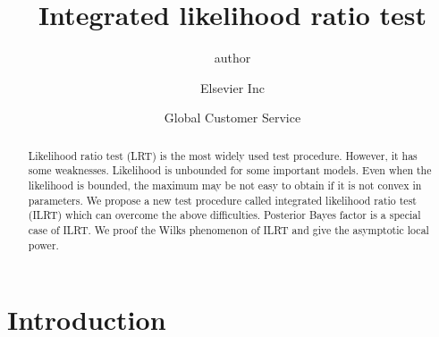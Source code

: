 \documentclass[3p]{elsarticle}
\begin{document}
\begin{frontmatter}

\title{Integrated likelihood ratio test}

\author{author }
\address{Radarweg 29, Amsterdam}

\author[mymainaddress,mysecondaryaddress]{Elsevier Inc}

\author[mysecondaryaddress]{Global Customer Service}

\address[mymainaddress]{1600 John F Kennedy Boulevard, Philadelphia}
\address[mysecondaryaddress]{360 Park Avenue South, New York}

\begin{abstract}

    Likelihood ratio test (LRT) is the most widely used test procedure. However, it has some weaknesses. Likelihood is unbounded for some important models. Even when the likelihood is bounded, the maximum may be not easy to obtain if it is not convex in parameters. We propose a new test procedure called integrated likelihood ratio test (ILRT) which can overcome the above difficulties. Posterior Bayes factor is a special case of ILRT\@. We proof the Wilks phenomenon of ILRT and give the asymptotic
    local power.
\end{abstract}

\begin{keyword}
\end{keyword}

\end{frontmatter}


\section{Introduction}
\end{document}

